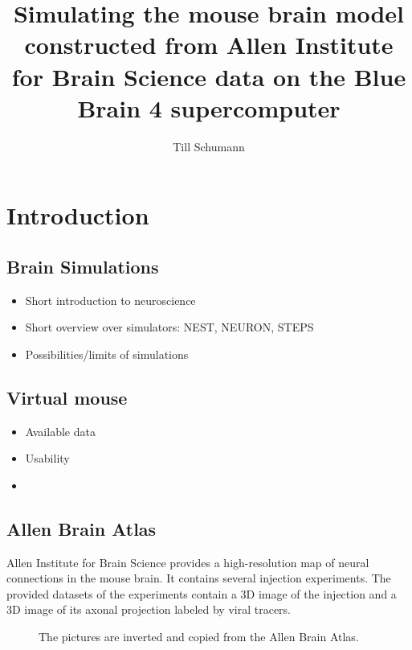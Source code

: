 \documentclass[a4paper]{article}
\title{ Simulating the mouse brain model constructed from Allen Institute for Brain Science data on the Blue Brain 4 supercomputer }
\author{Till Schumann}
\begin{document}
   \maketitle

\section{Introduction}
\subsection{Brain Simulations}
	\begin{itemize}
      \item Short introduction to neuroscience 
      \item Short overview over simulators: NEST, NEURON, STEPS
      \item Possibilities/limits of simulations
   \end{itemize}
   
\subsection{Virtual mouse}
	\begin{itemize}
      \item Available data
      \item Usability
      \item 
   \end{itemize}   

\subsection{Allen Brain Atlas}
   Allen Institute for Brain Science provides a high-resolution map of neural connections in the mouse brain.
   It contains several injection experiments. The provided datasets of the experiments 
   contain a 3D image of the injection and a 3D image of its axonal projection labeled by viral
   tracers.
   
   \begin{figure}[ht!]
   	\begin{center}
        \hspace{1cm}
    	   \end{center}
    	\caption{%
        The pictures are inverted and copied from the Allen Brain Atlas.
     }%
   \label{fig:atlas}
   \end{figure}
   
\end{document}
